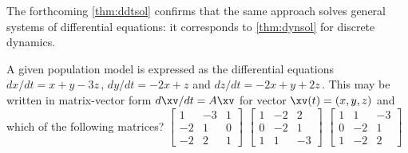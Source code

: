 The forthcoming \autoref{thm:ddtsol} confirms that the same approach solves general systems of differential equations: it corresponds to \autoref{thm:dynsol} for discrete dynamics.



\begin{activity}
A given population model is expressed as the differential equations \(dx/dt=x+y-3z\)\,, \(dy/dt=-2x+z\) and \(dz/dt=-2x+y+2z\)\,.
This may be written in matrix-vector form \(d\xv/dt=A\xv\) for vector \(\xv(t)=(x,y,z)\) and which of the following matrices?
{\(\begin{bmatrix} 1&-3&1
\\-2&1&0
\\-2&2&1 \end{bmatrix}\)}
{\(\begin{bmatrix} 1&-2&2
\\0&-2&1
\\1&1&-3 \end{bmatrix}\)}
{\(\begin{bmatrix} 1&1&-3
\\0&-2&1
\\1&-2&2 \end{bmatrix}\)}
\end{activity}




